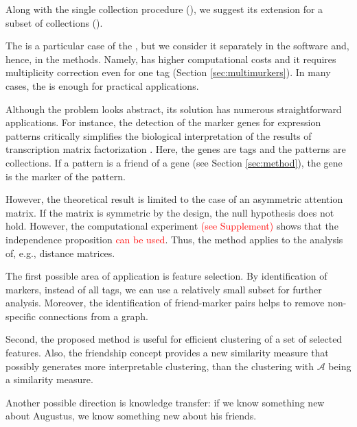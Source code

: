 \documentclass{llncs}
\begin{document}
Along with the single collection procedure (), we suggest its extension for a subset of collections ().

The  is a particular case of the , but we consider it separately in the software and, hence, in the methods. Namely,  has higher computational costs and it requires multiplicity correction even for one tag (Section \ref{sec:multimurkers}). In many cases, the  is enough for practical applications. 

Although the problem looks abstract, its solution has numerous straightforward applications. For instance, the detection of the marker genes \cite{stein-obrien_patternmarkers_2017} for expression patterns critically simplifies the biological interpretation of the results of transcription matrix factorization \cite{Stein_2018,Fertig_2016}. Here, the genes are tags and the patterns are collections. If a pattern is a friend of a gene (see Section \ref{sec:method}), the gene is the marker of the pattern.

However, the theoretical result is limited to the case of an asymmetric attention matrix. If the matrix is symmetric by the design, the null hypothesis does not hold. However, the computational experiment \textcolor{red}{(see Supplement)} shows that the independence proposition \textcolor{red}{can be used}. Thus, the method applies to the analysis of, e.g., distance matrices. 

The first possible area of application is feature selection. By identification of markers, instead of all tags, we can use a relatively small subset for further analysis. Moreover, the identification of friend-marker pairs helps to remove non-specific connections from a graph. 

Second, the proposed method is useful for efficient clustering of a set of selected features. Also, the friendship concept provides a new similarity measure that possibly generates more interpretable clustering, than the clustering with $\mathcal{A}$ being a similarity measure.

Another possible direction is knowledge transfer: if we know something new about Augustus, we know something new about his friends. 
\subsection{}


\end{document}
